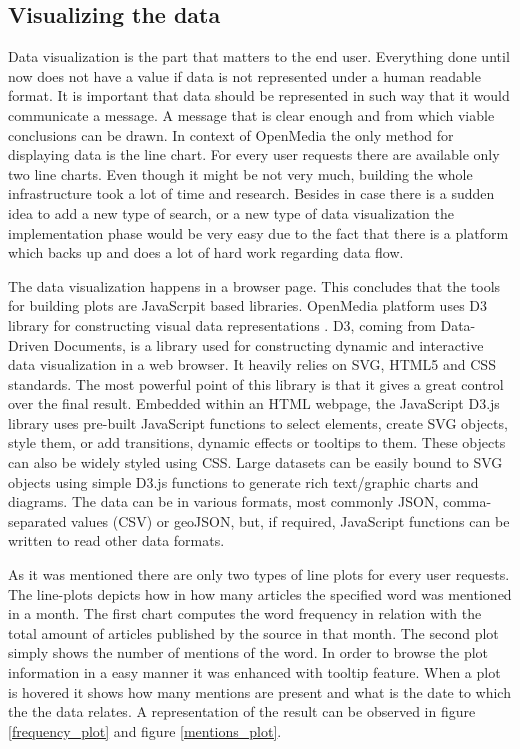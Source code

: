 \subsection{Visualizing the data}
Data visualization is the part that matters to the end user. Everything done until now does not have a value if data is not represented under a human readable format. It is important that data should be represented in such way that it would communicate a message. A message that is clear enough and from which viable conclusions can be drawn. In context of OpenMedia the only method for displaying data is the line chart. For every user requests there are available only two line charts. Even though it might be not very much, building the whole infrastructure took a lot of time and research. Besides in case there is a sudden idea to add a new type of search, or a new type of data visualization the implementation phase would be very easy due to the fact that there is a platform which backs up and does a lot of hard work regarding data flow.

The data visualization happens in a browser page. This concludes that the tools for building plots are JavaScrpit based libraries. OpenMedia platform uses D3 library for constructing visual data representations \cite{d3}. D3, coming from Data-Driven Documents, is a library used for constructing dynamic and interactive data visualization in a web browser. It heavily relies on SVG, HTML5 and CSS standards. The most powerful point of this library is that it gives a great control over the final result. Embedded within an HTML webpage, the JavaScript D3.js library uses pre-built JavaScript functions to select elements, create SVG objects, style them, or add transitions, dynamic effects or tooltips to them. These objects can also be widely styled using CSS. Large datasets can be easily bound to SVG objects using simple D3.js functions to generate rich text/graphic charts and diagrams. The data can be in various formats, most commonly JSON, comma-separated values (CSV) or geoJSON, but, if required, JavaScript functions can be written to read other data formats.

As it was mentioned there are only two types of line plots for every user requests. The line-plots depicts how in how many articles the specified word was mentioned in a month. The first chart computes the word frequency in relation with the total amount of articles published by the source in that month. The second plot simply shows the number of mentions of the word. In order to browse the plot information in a easy manner it was enhanced with tooltip feature. When a plot is hovered it shows how many mentions are present and what is the date to which the the data relates. A representation of the result can be observed in figure \ref{frequency_plot} and figure \ref{mentions_plot}.

